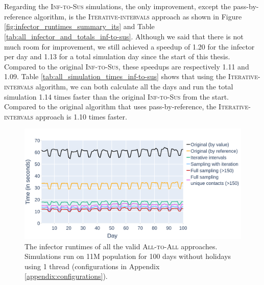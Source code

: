 \\\\
Regarding the \textsc{Inf-to-Sus} simulations, the only improvement, except the pass-by-reference algorithm, is the \textsc{Iterative-intervals} approach as shown in Figure \ref{fig:infector_runtimes_summary_its} and Table \ref{tab:all_infector_and_totals_inf-to-sus}. Although we said that there is not much room for improvement, we still achieved a speedup of 1.20 for the infector per day and 1.13 for a total simulation day since the start of this thesis. Compared to the original \textsc{Inf-to-Sus}, these speedups are respectively 1.11 and 1.09. Table \ref{tab:all_simulation_times_inf-to-sus} shows that using the \textsc{Iterative-intervals} algorithm, we can both calculate all the days and run the total simulation 1.14 times faster than the original \textsc{Inf-to-Sus} from the start. Compared to the original algorithm that uses pass-by-reference, the \textsc{Iterative-intervals} approach is 1.10 times faster.

\begin{figure}
    \centering
    \includegraphics[width=\linewidth]{4 - Sampling/fig/summary/infector_runtimes_summary.png}
    \caption{The infector runtimes of all the valid \textsc{All-to-All} approaches. Simulations run on 11M population for 100 days without holidays using 1 thread (configurations in Appendix \ref{appendix:configurations}).}
    \label{fig:infector_runtimes_summary}
\end{figure}

